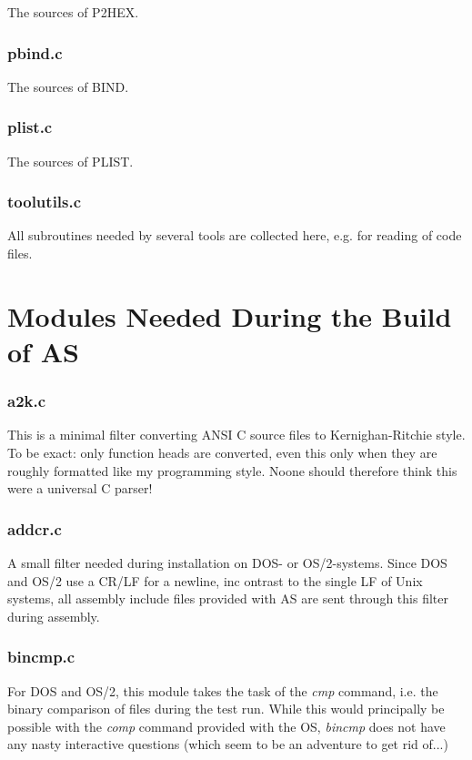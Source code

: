 \documentclass[12pt,twoside]{report}
\newcommand{\asname}{{AS}}
\begin{document}
The sources of P2HEX.

\subsubsection{pbind.c}

The sources of BIND.

\subsubsection{plist.c}

The sources of PLIST.

\subsubsection{toolutils.c}

All subroutines needed by several tools are collected here, e.g. for
reading of code files.

\section{Modules Needed During the Build of \asname{}}

\subsubsection{a2k.c}

This is a minimal filter converting ANSI C source files to
Kernighan-Ritchie style.  To be exact: only function heads are converted,
even this only when they are roughly formatted like my programming style.
Noone should therefore think this were a universal C parser!

\subsubsection{addcr.c}

A small filter needed during installation on DOS- or OS/2-systems.  Since
DOS and OS/2 use a CR/LF for a newline, inc ontrast to the single LF of
Unix systems, all assembly include files provided with \asname{} are sent through
this filter during assembly.

\subsubsection{bincmp.c}

For DOS and OS/2, this module takes the task of the {\em cmp} command,
i.e. the binary comparison of files during the test run.  While this would
principally be possible with the {\em comp} command provided with the OS,
{\em bincmp} does not have any nasty interactive questions (which seem to
be an adventure to get rid of...)
\end{document}
